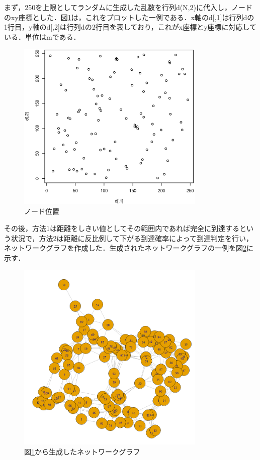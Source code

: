 まず，250を上限としてランダムに生成した乱数を行列d(N,2)に代入し，ノードのxy座標とした．図\ref{fig:plotnode}は，これをプロットした一例である．x軸のd[,1]は行列dの1行目，y軸のd[,2]は行列dの2行目を表しており，これがx座標とy座標に対応している．単位は\si{\meter}である．


\begin{figure}[H]
  \centering
  \includegraphics[width=0.8\textwidth]{figures/plotnode.eps}
  \caption{ノード位置}
  \label{fig:plotnode}
\end{figure}

その後，方法1は距離をしきい値としてその範囲内であれば完全に到達するという状況で，方法2は距離に反比例して下がる到達確率によって到達判定を行い，ネットワークグラフを作成した．生成されたネットワークグラフの一例を図\ref{fig:plotgraph}に示す．
\begin{figure}[H]
  \centering
  \includegraphics[width=0.8\textwidth]{figures/plotg.png}
  \caption{図\ref{fig:plotnode}から生成したネットワークグラフ}
  \label{fig:plotgraph}
\end{figure}

